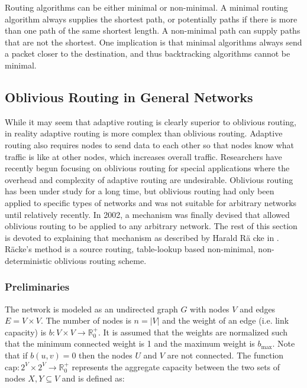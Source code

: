 Routing algorithms can be either minimal or non-minimal. A minimal routing algorithm always supplies the shortest path, or potentially paths if there is more than one path of the same shortest length. A non-minimal path can supply paths that are not the shortest. One implication is that minimal algorithms always send a packet closer to the destination, and thus backtracking algorithms cannot be minimal. \cite{ref:1997-duato-interconnection_networks}

\subsection{Oblivious Routing in General Networks}\label{sec:routing:background:oblivious_routing}

While it may seem that adaptive routing is clearly superior to oblivious routing, in reality adaptive routing is more complex than oblivious routing. Adaptive routing also requires nodes to send data to each other so that nodes know what traffic is like at other nodes, which increases overall traffic. Researchers have recently begun focusing on oblivious routing for special applications where the overhead and complexity of adaptive routing are undesirable.  Oblivious routing has been under study for a long time, but oblivious routing had only been applied to specific types of networks and was not suitable for arbitrary networks until relatively recently. In 2002, a mechanism was finally devised that allowed oblivious routing to be applied to any arbitrary network. The rest of this section is devoted to explaining that mechanism as described by Harald R\"a cke in \cite{ref:2003-racke-oblivious_routing}. R\"acke's method is a source routing, table-lookup based non-minimal, non-deterministic oblivious routing scheme.

\subsubsection[Preliminaries]{Preliminaries}\cite{ref:2003-racke-oblivious_routing} \label{sec:routing:background:oblivious_routing:preliminaries}

The network is modeled as an undirected graph $G$ with nodes $V$  and edges $E=V\times V $. The number of nodes is $n=|V| $ and the weight of an edge (i.e. link capacity) is $b:V\times V \rightarrow \mathbb{R}^+_0 $. It is assumed that the weights are normalized such that the minimum connected weight is 1 and the maximum weight is $b_{\textrm{max}} $. Note that if $b(u,v)=0 $  then the nodes $U$ and $V$ are not connected. The function $\textrm{cap}:2^V \times 2^V \rightarrow \mathbb{R}^+_0 $  represents the aggregate capacity between the two sets of nodes $X,Y \subseteq V $ and is defined as:


